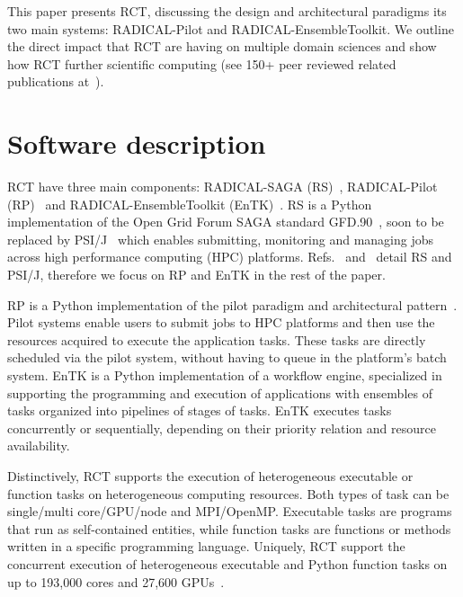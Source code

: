 \documentclass[preprint,12pt, a4paper]{elsarticle}
\begin{document}
This paper presents RCT, discussing the design and architectural paradigms its
two main systems: RADICAL-Pilot and RADICAL-EnsembleToolkit. We outline
the direct impact that RCT are having on multiple domain sciences
and show how RCT further scientific computing (see 150+ peer reviewed related
publications at~\cite{radical-pub-url,scholar-pub-url}).



\section{Software description}\label{sec:description}


RCT have three main components: RADICAL-SAGA (RS)~\cite{merzky2015saga},
RADICAL-Pilot (RP)~\cite{merzky2018using} and RADICAL-EnsembleToolkit
(EnTK)~\cite{balasubramanian2016ensemble,balasubramanian2018harnessing}. RS is a
Python implementation of the Open Grid Forum SAGA standard
GFD.90~\cite{tom2006saga}, soon to be replaced by
PSI/J~\cite{hategan2023psi} which enables submitting, monitoring and managing
jobs across high performance computing (HPC) platforms.
Refs.~\cite{merzky2015saga} and~\cite{hategan2023psi} detail RS and PSI/J,
therefore we focus on RP and EnTK in the rest of the paper.

RP is a Python implementation of the pilot paradigm and architectural
pattern~\cite{turilli2018comprehensive,luckow2012p}. Pilot systems enable users
to submit jobs to HPC platforms and then use the resources acquired to execute
the application tasks. These tasks are directly scheduled via the pilot system,
without having to queue in the platform's batch system. EnTK is a Python
implementation of a workflow engine, specialized in supporting the programming
and execution of applications with ensembles of tasks organized into pipelines
of stages of tasks. EnTK executes tasks concurrently or sequentially, depending
on their priority relation and resource availability.

Distinctively, RCT supports the execution of heterogeneous executable or
function tasks on heterogeneous computing resources. Both types of task can be
single/multi core/GPU/node and MPI/OpenMP\@. Executable tasks are programs that
run as self-contained entities, while function tasks are functions or methods
written in a specific programming language. Uniquely, RCT support the concurrent
execution of heterogeneous executable and Python function tasks on up to 193,000
cores and 27,600 GPUs~\cite{merzky2021design}.
\end{document}
